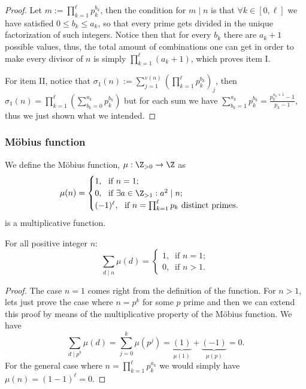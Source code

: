 \begin{proof}
   Let \(m := \prod_{k = 1}^\ell p_k^{b_k}\), then the condition for \(m \mid
   n\) is that \(\forall k \in [0, \ell]\) we have satisfied \(0 \leqslant b_k
   \leqslant a_k\), so that every prime gets divided in the unique factorization
   of such integers. Notice then that for every \(b_k\) there are \(a_k + 1\)
   possible values, thus, the total amount of combinations one can get in order
   to make every divisor of \(n\) is simply  \(\prod_{k=1}^\ell (a_k + 1)\),
   which proves item I.

   For item II, notice that \(\sigma_1(n) := \sum_{j = 1}^{v(n)} \left( \prod_{k
   = 1}^{\ell} p_k^{b_k} \right)_j\), then \(\sigma_1(n) =\prod_{k=1}^\ell \left(
   \sum_{b_k = 0}^{a_k} p_k^{b_k}\right)\) but for each sum we have \(\sum_{b_k =
   1}^{a_k} p_k^{b_k} = \frac{p_k^{a_k + 1} - 1}{p_k - 1}\), thus we just shown
   what we intended.
\end{proof}

\subsubsection{Möbius function}

\begin{definition}
   We define the Möbius function, \(\mu: \Z_{>0} \to \Z\) as
   \[
      \mu(n) =
      \begin{cases}
         1,\ \text{ if } n = 1;\\
         0,\ \text{ if } \exists a \in \Z_{> 1}: a^2 \mid n;\\
         (-1)^\ell,\ \text{ if } n = \prod_{k = 1}^{\ell} p_k \text{
         distinct primes. }
      \end{cases}
   \]
   is a multiplicative function.
\end{definition}

\begin{proposition}
   For all positive integer \(n\):
    \[
       \sum_{d \mid n} \mu(d) =
       \begin{cases}
          1,\ \text{ if } n = 1;\\
          0,\ \text{ if } n > 1.
       \end{cases}
   \]
\end{proposition}

\begin{proof}
   The case \(n = 1\) comes right from the definition of the function. For \(n
   > 1\), lets just prove the case where \(n = p^k\) for some  \(p\) prime and
   then we can extend this proof by means of the multiplicative property of the
   Möbius function. We have
    \[
       \sum_{d \mid p^k} \mu(d) = \sum_{j = 0}^k \mu(p^j) =
       \underbrace{(1)}_{\mu(1)} + \underbrace{(-1)}_{\mu(p)} = 0.
   \]
   For the general case where \(n = \prod_{k = 1}^\ell p_k^{a_k}\) we would
   simply have  \(\mu(n) = (1 - 1)^\ell = 0\).
\end{proof}

